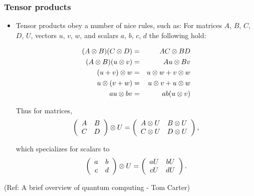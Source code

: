  \begin{frame}[fragile]\frametitle{Tensor products}

\begin{itemize}
		\item Tensor products obey a number of nice rules, such as:
		For matrices $A$, $B$, $C$, $D$, $U$, vectors $u$, $v$, $w$, and scalars $a$, $b$, $c$, $d$ the following hold:

\begin{eqnarray*}
(A \otimes B) (C \otimes D) &=& AC\otimes BD\\
(A \otimes B) (u \otimes v) &=& Au\otimes Bv\\
(u+v)\otimes w&=& u\otimes w + v\otimes w\\
u\otimes(v+w)&=& u\otimes v + u\otimes w\\
au\otimes bv &=& ab(u\otimes v)
\end{eqnarray*}

Thus for matrices,
$$\left(\begin{array}{cc}A & B\\C & D\end{array}\right) \otimes U = 
\left(\begin{array}{cc}A \otimes U & B \otimes U\\C \otimes U & D \otimes U\end{array}\right),$$

which specializes for scalars to
$$\left(\begin{array}{cc}a & b\\c & d\end{array}\right) \otimes U = 
\left(\begin{array}{cc}a U & b U\\c U & d U\end{array}\right).$$

\end{itemize}

\tiny{(Ref: A brief overview of quantum computing - Tom Carter)}

\end{frame}

